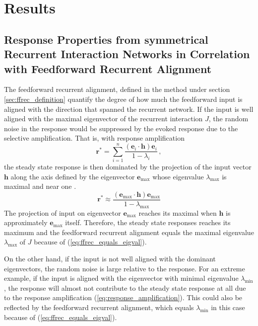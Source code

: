 \documentclass[11pt]{article}
\begin{document}
	\section{Results}
	
	\subsection{Response Properties from symmetrical Recurrent Interaction Networks in Correlation with Feedforward Recurrent Alignment} \label{sec:results_symmetric}
	The feedforward recurrent alignment, defined in the method under section \ref{sec:ffrec_definition} quantify the degree of how much the feedforward input is aligned with the direction that spanned the recurrent network. If the input is well aligned with the maximal eigenvector of the recurrent interaction $J$, the random noise in the response would be suppressed by the evoked response due to the selective amplification. That is, with response amplification
		\begin{equation} \label{eq:response_amplification}
			\mathbf{r}^* = \sum_{i = 1}^{n} \frac{(\mathbf{e}_i \cdot \mathbf{h}) \mathbf{e}_i}{1-\lambda_i} \, , 
		\end{equation}
	the steady state response is then dominated by the projection of the input vector $\mathbf{h}$ along the axis defined by the eigenvector $\mathbf{e}_{\text{max}}$ whose eigenvalue $\lambda_{\text{max}}$ is maximal and near one \cite{dayan2005theoretica}. 
		\begin{equation} \label{eq:selective_amplification}
			\mathbf{r}^* \approx \frac{(\mathbf{e}_{\text{max}} \cdot \mathbf{h}) \mathbf{e}_{\text{max}}}{1 - \lambda_{\text{max}}}
		\end{equation}
	The projection of input on eigenvector $\mathbf{e}_{\text{max}}$ reaches its maximal when $\mathbf{h}$ is approximately $\mathbf{e}_{\text{max}}$ itself. Therefore, the steady state responses reaches its maximum and the feedforward recurrent alignment equals the maximal eigenvalue $\lambda_{\text{max}}$ of $J$ because of (\ref{eq:ffrec_equals_eigval}). 
	
	On the other hand, if the input is not well aligned with the dominant eigenvectors, the random noise is large relative to the response. For an extreme example, if the input is aligned with the eigenvector with minimal eigenvalue $\lambda_{\text{min}}$, the response will almost not contribute to the steady state response at all due to the response amplification (\ref{eq:response_amplification}). This could also be reflected by the feedforward recurrent alignment, which equals $\lambda_{\text{min}}$ in this case because of (\ref{eq:ffrec_equals_eigval}). 
	
\end{document}
